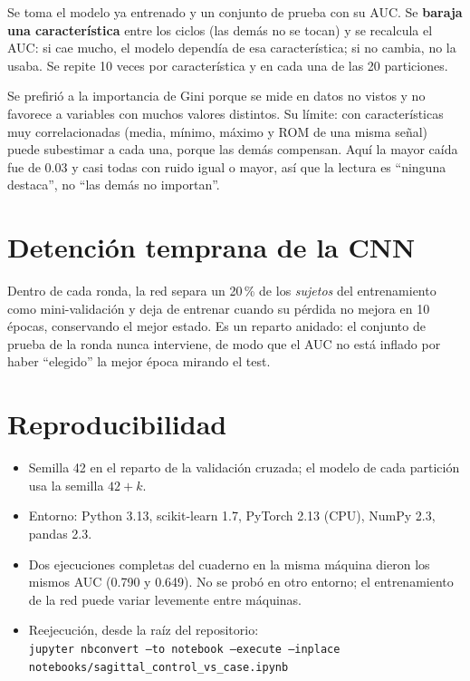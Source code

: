 \documentclass[11pt,a4paper]{article}
\begin{document}
Se toma el modelo ya entrenado y un conjunto de prueba con su AUC. Se \textbf{baraja una característica} entre los ciclos (las demás no se tocan) y se recalcula el AUC: si cae mucho, el modelo dependía de esa característica; si no cambia, no la usaba. Se repite 10 veces por característica y en cada una de las 20 particiones.

Se prefirió a la importancia de Gini porque se mide en datos no vistos y no favorece a variables con muchos valores distintos. Su límite: con características muy correlacionadas (media, mínimo, máximo y ROM de una misma señal) puede subestimar a cada una, porque las demás compensan. Aquí la mayor caída fue de 0.03 y casi todas con ruido igual o mayor, así que la lectura es ``ninguna destaca'', no ``las demás no importan''.

\section{Detención temprana de la CNN}

Dentro de cada ronda, la red separa un 20\,\% de los \emph{sujetos} del entrenamiento como mini-validación y deja de entrenar cuando su pérdida no mejora en 10 épocas, conservando el mejor estado. Es un reparto anidado: el conjunto de prueba de la ronda nunca interviene, de modo que el AUC no está inflado por haber ``elegido'' la mejor época mirando el test.

\section{Reproducibilidad}

\begin{itemize}
\item Semilla 42 en el reparto de la validación cruzada; el modelo de cada partición usa la semilla $42+k$.
\item Entorno: Python 3.13, scikit-learn 1.7, PyTorch 2.13 (CPU), NumPy 2.3, pandas 2.3.
\item Dos ejecuciones completas del cuaderno en la misma máquina dieron los mismos AUC (0.790 y 0.649). No se probó en otro entorno; el entrenamiento de la red puede variar levemente entre máquinas.
\item Reejecución, desde la raíz del repositorio:\\
\texttt{\small jupyter nbconvert --to notebook --execute --inplace}\\
\texttt{\small notebooks/sagittal\_control\_vs\_case.ipynb}
\end{itemize}
\end{document}
